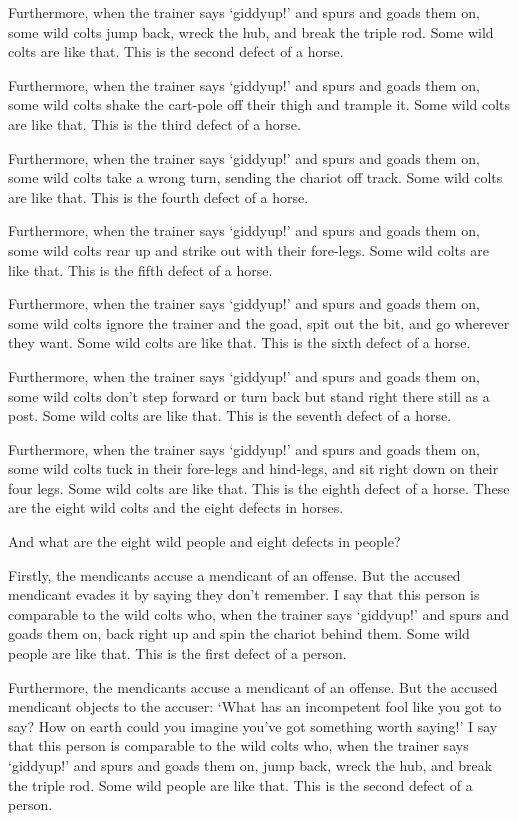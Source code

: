 \documentclass[12pt,openany]{book}%
\begin{document}
Furthermore, when the trainer says ‘giddyup!’ and spurs and goads them on, some wild colts jump back, wreck the hub, and break the triple rod. Some wild colts are like that. This is the second defect of a horse. 

Furthermore, when the trainer says ‘giddyup!’ and spurs and goads them on, some wild colts shake the cart-pole off their thigh and trample it. Some wild colts are like that. This is the third defect of a horse. 

Furthermore, when the trainer says ‘giddyup!’ and spurs and goads them on, some wild colts take a wrong turn, sending the chariot off track. Some wild colts are like that. This is the fourth defect of a horse. 

Furthermore, when the trainer says ‘giddyup!’ and spurs and goads them on, some wild colts rear up and strike out with their fore-legs. Some wild colts are like that. This is the fifth defect of a horse. 

Furthermore, when the trainer says ‘giddyup!’ and spurs and goads them on, some wild colts ignore the trainer and the goad, spit out the bit, and go wherever they want. Some wild colts are like that. This is the sixth defect of a horse. 

Furthermore, when the trainer says ‘giddyup!’ and spurs and goads them on, some wild colts don’t step forward or turn back but stand right there still as a post. Some wild colts are like that. This is the seventh defect of a horse. 

Furthermore, when the trainer says ‘giddyup!’ and spurs and goads them on, some wild colts tuck in their fore-legs and hind-legs, and sit right down on their four legs. Some wild colts are like that. This is the eighth defect of a horse. These are the eight wild colts and the eight defects in horses. 

And what are the eight wild people and eight defects in people? 

Firstly, the mendicants accuse a mendicant of an offense. But the accused mendicant evades it by saying they don’t remember. I say that this person is comparable to the wild colts who, when the trainer says ‘giddyup!’ and spurs and goads them on, back right up and spin the chariot behind them. Some wild people are like that. This is the first defect of a person. 

Furthermore, the mendicants accuse a mendicant of an offense. But the accused mendicant objects to the accuser: ‘What has an incompetent fool like you got to say? How on earth could you imagine you’ve got something worth saying!’ I say that this person is comparable to the wild colts who, when the trainer says ‘giddyup!’ and spurs and goads them on, jump back, wreck the hub, and break the triple rod. Some wild people are like that. This is the second defect of a person. 
\end{document}
